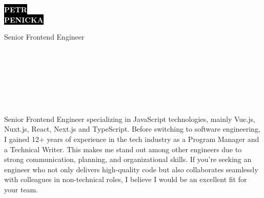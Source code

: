 \documentclass[9pt]{developercv}
\begin{document}
\begin{minipage}[t]{0.41\textwidth}
  \vspace{-\baselineskip}

  \colorbox{black}{{\HUGE\textcolor{white}{\textbf{\MakeUppercase{Petr}}}}}
  \\
  \colorbox{black}{{\HUGE\textcolor{white}{\textbf{\MakeUppercase{Penicka}}}}}

  \vspace{6pt}

  {\huge Senior Frontend Engineer}
\end{minipage}
\begin{minipage}[t]{0.275\textwidth}
  \vspace{-\baselineskip}

  \\
  \\
  \\
\end{minipage}
\begin{minipage}[t]{0.34\textwidth}
  \vspace{-\baselineskip}

  \\
  \\

\end{minipage}

\vspace{0.1cm}


\begin{minipage}[t]{1\textwidth}
  \vspace{-\baselineskip}

  {Senior Frontend Engineer specializing in JavaScript technologies, mainly Vue.js, Nuxt.js, React, Next.js and TypeScript. Before switching to software engineering, I gained 12+ years of experience in the tech industry as a Program Manager and a Technical Writer. This makes me stand out among other engineers due to strong communication, planning, and organizational skills. If you’re seeking an engineer who not only delivers high-quality code but also collaborates seamlessly with colleagues in non-technical roles, I believe I would be an excellent fit for your team.}\\
\end{minipage}
\end{document}
